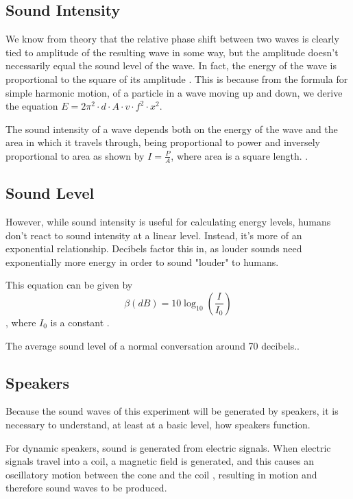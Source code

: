 \documentclass[index]{subfiles}
\begin{document}
\subsection{Sound Intensity}

We know from theory that the relative phase shift between two waves is clearly tied to amplitude of the resulting wave in some way, but the amplitude doesn't necessarily equal the sound level of the wave. In fact, the energy of the wave is proportional to the square of its amplitude \cite{openstax}. This is because from the formula for simple harmonic motion, of a particle in a wave moving up and down, we derive the equation \(E=2\pi^2\cdot d\cdot A\cdot v\cdot f^2\cdot x^2\).


The sound intensity of a wave depends both on the energy of the wave and the area in which it travels through, being proportional to power and inversely proportional to area as shown by \(I=\frac{P}{A}\), where area is a square length. \cite{openstax}.

\subsection{Sound Level}

However, while sound intensity is useful for calculating energy levels, humans don't react to sound intensity at a linear level. Instead, it's more of an exponential relationship. Decibels factor this in, as louder sounds need exponentially more energy in order to sound "louder" to humans.

This equation can be given by
$$
    \beta\left(dB\right)=10\log_{10}\left(\frac{I}{I_{0}}\right)
$$, where \(I_{0}\) is a constant \cite{openstax}.

The average sound level of a normal conversation around 70 decibels.\cite{speakers}.

\subsection{Speakers}

Because the sound waves of this experiment will be generated by speakers, it is necessary to understand, at least at a basic level, how speakers function. \cite{speakers}

For dynamic speakers, sound is generated from electric signals. When electric signals travel into a coil, a magnetic field is generated, and this causes an oscillatory motion between the cone and the coil \cite{openstax} \cite{speakers}, resulting in motion and therefore sound waves to be produced.
\end{document}

